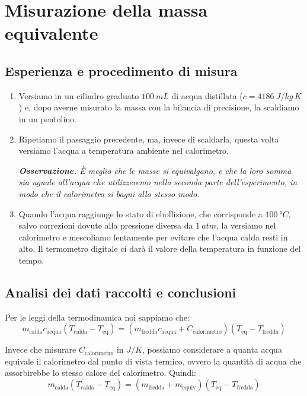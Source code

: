 \documentclass{article}
\begin{document}
\section{Misurazione della massa equivalente}
    
\subsection{Esperienza e procedimento di misura}
    
\begin{enumerate}
    \item
        Versiamo in un cilindro graduato $\qty{100}{mL}$ di acqua distillata
        ($c=\qty{4186}{J \per kg\,K}$) e, dopo averne misurato la massa con
        la bilancia di precisione, la scaldiamo in un pentolino.
    \item
        Ripetiamo il passaggio precedente, ma, invece di scaldarla, questa volta
        versiamo l'acqua a temperatura ambiente nel calorimetro.
        
    \emph{
        \textbf{Osservazione.} È meglio che le masse si equivalgano, e che la loro
        somma sia uguale all'acqua che utilizzeremo nella seconda parte dell'esperimento,
        in modo che il calorimetro si bagni allo stesso modo.
        }
        
    \item
        Quando l'acqua raggiunge lo stato di ebollizione, che corrisponde a 
        $\qty{100}{\degree C}$, salvo correzioni dovute alla pressione diversa da
        $\qty{1}{atm}$, la versiamo nel calorimetro e mescoliamo lentamente
        per evitare che l'acqua calda resti in alto. Il termometro digitale ci
        darà il valore della temperatura in funzione del tempo.
\end{enumerate}
        
\subsection{Analisi dei dati raccolti e conclusioni}
Per le leggi della termodinamica noi sappiamo che:
    \[
        m_\text{calda} c_\text{acqua} (T_\text{calda}-T_\text{eq}) =
        (m_\text{fredda} c_\text{acqua} + C_\text{calorimetro})(T_\text{eq}-T_\text{fredda})
    \]

Invece che misurare $C_\text{calorimetro}$ in $\unit{J\per K}$, possiamo considerare a
quanta acqua equivale il calorimetro dal punto di vista termico, ovvero la quantità di
acqua che assorbirebbe lo stesso calore del calorimetro. Quindi:
    \[
        m_\text{calda} (T_\text{calda}-T_\text{eq}) =
        (m_\text{fredda} + m_\text{equiv})(T_\text{eq}-T_\text{fredda})
    \]
\end{document}
